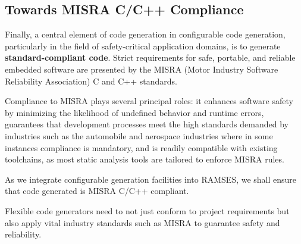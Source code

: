\subsection*{Towards MISRA C/C++ Compliance}

Finally, a central element of code generation in configurable code generation, particularly in the field of safety-critical application domains, is to generate \textbf{standard-compliant code}. Strict requirements for safe, portable, and reliable embedded software are presented by the MISRA (Motor Industry Software Reliability Association) C and C++ standards.
\par
Compliance to MISRA plays several principal roles: it enhances software safety by minimizing the likelihood of undefined behavior and runtime errors, guarantees that development processes meet the high standards demanded by industries such as the automobile and aerospace industries where in some instances compliance is mandatory, and is readily compatible with existing toolchains, as most static analysis tools are tailored to enforce MISRA rules.
\par
As we integrate configurable generation facilities into RAMSES, we shall ensure that code generated is MISRA C/C++ compliant.

\begin{tcolorbox}[colback=blue!5, colframe=blue!40!black] Flexible code generators need to not just conform to project requirements but also apply vital industry standards such as MISRA to guarantee safety and reliability. \end{tcolorbox}







